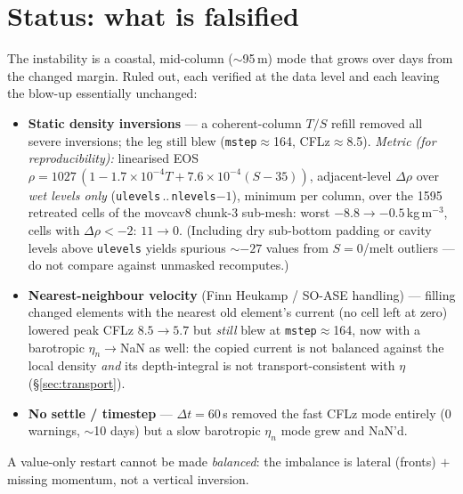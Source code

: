 \documentclass[11pt,a4paper]{article}
\newcommand{\code}[1]{\texttt{#1}}
\begin{document}
\section{Status: what is falsified}\label{sec:status}
The instability is a coastal, mid-column ($\sim$95\,m) mode that grows over days from the changed
margin. Ruled out, each verified at the data level and each leaving the blow-up essentially
unchanged:
\begin{itemize}[leftmargin=1.5em,itemsep=1pt]
  \item \textbf{Static density inversions} --- a coherent-column $T/S$ refill removed all severe
        inversions; the leg still blew (\code{mstep}$\approx$164, CFLz$\approx$8.5).
        \emph{Metric (for reproducibility):} linearised EOS
        $\rho = 1027\,(1 - 1.7{\times}10^{-4}T + 7.6{\times}10^{-4}(S-35))$, adjacent-level
        $\Delta\rho$ over \emph{wet levels only} (\code{ulevels}\,..\,\code{nlevels}$-1$), minimum
        per column, over the 1595 retreated cells of the movcav8 chunk-3 sub-mesh: worst
        $-8.8\to-0.5$\,kg\,m$^{-3}$, cells with $\Delta\rho<-2$: $11\to0$. (Including dry
        sub-bottom padding or cavity levels above \code{ulevels} yields spurious $\sim{-27}$
        values from $S{=}0$/melt outliers --- do not compare against unmasked recomputes.)
  \item \textbf{Nearest-neighbour velocity} (Finn Heukamp / SO-ASE handling) --- filling changed
        elements with the nearest old element's current (no cell left at zero) lowered peak CFLz
        $8.5\to5.7$ but \emph{still} blew at \code{mstep}$\approx$164, now with a barotropic
        $\eta_n\!\to\!$NaN as well: the copied current is not balanced against the local density
        \emph{and} its depth-integral is not transport-consistent with $\eta$ (\S\ref{sec:transport}).
  \item \textbf{No settle / timestep} --- $\Delta t=60$\,s removed the fast CFLz mode entirely
        (0 warnings, $\sim$10 days) but a slow barotropic $\eta_n$ mode grew and NaN'd.
\end{itemize}
A value-only restart cannot be made \emph{balanced}: the imbalance is lateral (fronts) $+$ missing
momentum, not a vertical inversion.
\end{document}
